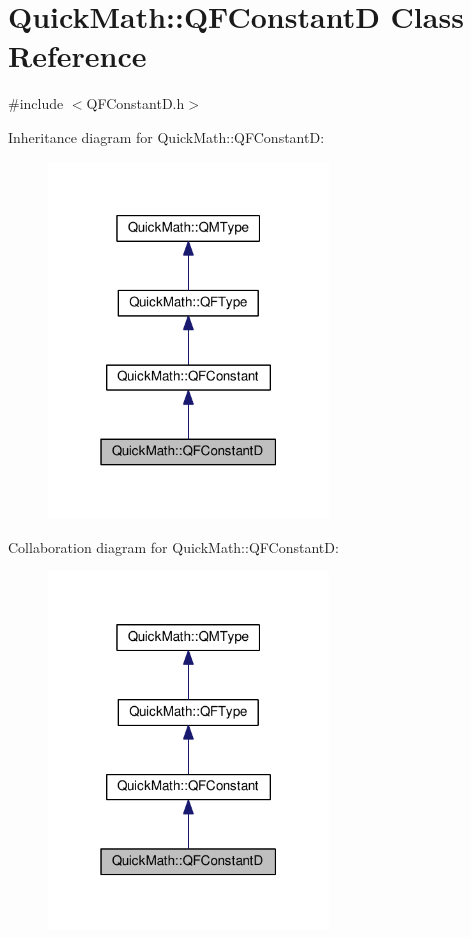 \hypertarget{classQuickMath_1_1QFConstantD}{}\section{Quick\+Math\+:\+:Q\+F\+Constant\+D Class Reference}
\label{classQuickMath_1_1QFConstantD}


{\ttfamily \#include $<$Q\+F\+Constant\+D.\+h$>$}



Inheritance diagram for Quick\+Math\+:\+:Q\+F\+Constant\+D\+:
\nopagebreak
\begin{figure}[H]
\begin{center}
\leavevmode
\includegraphics[width=211pt]{classQuickMath_1_1QFConstantD__inherit__graph}
\end{center}
\end{figure}


Collaboration diagram for Quick\+Math\+:\+:Q\+F\+Constant\+D\+:
\nopagebreak
\begin{figure}[H]
\begin{center}
\leavevmode
\includegraphics[width=211pt]{classQuickMath_1_1QFConstantD__coll__graph}
\end{center}
\end{figure}
